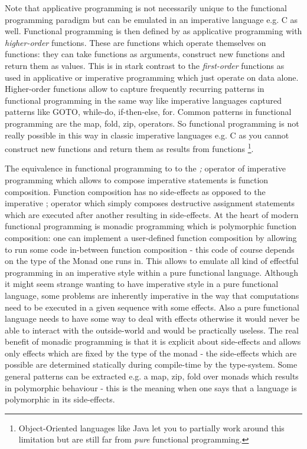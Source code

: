 Note that applicative programming is not necessarily unique to the functional programming paradigm but can be emulated in an imperative language e.g. C as well. Functional programming is then defined by \cite{maclennan_functional_1990} as applicative programming with \textit{higher-order} functions. These are functions which operate themselves on functions: they can take functions as arguments, construct new functions and return them as values. This is in stark contrast to the \textit{first-order} functions as used in applicative or imperative programming which just operate on data alone. Higher-order functions allow to capture frequently recurring patterns in functional programming in the same way like imperative languages captured patterns like GOTO, while-do, if-then-else, for. Common patterns in functional programming are the map, fold, zip, operators.
So functional programming is not really possible in this way in classic imperative languages e.g. C as you cannot construct new functions and return them as results from functions \footnote{Object-Oriented languages like Java let you to partially work around this limitation but are still far from \textit{pure} functional programming.}.

The equivalence in functional programming to to the \textit{;} operator of imperative programming which allows to compose imperative statements is function composition. Function composition has no side-effects as opposed to the imperative ; operator which simply composes destructive assignment statements which are executed after another resulting in side-effects.
At the heart of modern functional programming is monadic programming which is polymorphic function composition: one can implement a user-defined function composition by allowing to run some code in-between function composition - this code of course depends on the type of the Monad one runs in. This allows to emulate all kind of effectful programming in an imperative style within a pure functional language. Although it might seem strange wanting to have imperative style in a pure functional language, some problems are inherently imperative in the way that computations need to be executed in a given sequence with some effects. Also a pure functional language needs to have some way to deal with effects otherwise it would never be able to interact with the outside-world and would be practically useless. The real benefit of monadic programming is that it is explicit about side-effects and allows only effects which are fixed by the type of the monad - the side-effects which are possible are determined statically during compile-time by the type-system. Some general patterns can be extracted e.g. a map, zip, fold over monads which results in polymorphic behaviour - this is the meaning when one says that a language is polymorphic in its side-effects.

